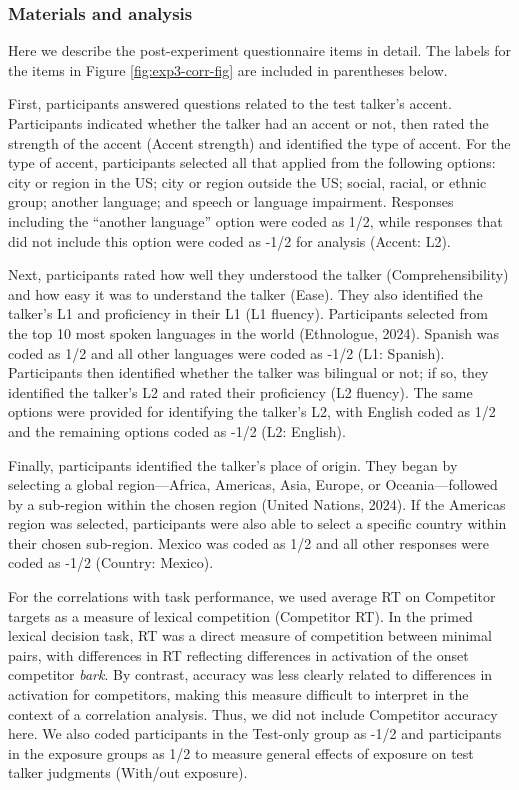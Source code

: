 \documentclass[
  12pt,
  twoside]{article}
\begin{document}
\hypertarget{corr-mat}{%
\subsubsection{Materials and analysis}\label{corr-mat}}

Here we describe the post-experiment questionnaire items in detail.
The labels for the items in Figure \ref{fig:exp3-corr-fig} are included in parentheses below.

First, participants answered questions related to the test talker's accent.
Participants indicated whether the talker had an accent or not, then rated the strength of the accent (Accent strength) and identified the type of accent.
For the type of accent, participants selected all that applied from the following options: city or region in the US; city or region outside the US; social, racial, or ethnic group; another language; and speech or language impairment.
Responses including the ``another language'' option were coded as 1/2, while responses that did not include this option were coded as -1/2 for analysis (Accent: L2).

Next, participants rated how well they understood the talker (Comprehensibility) and how easy it was to understand the talker (Ease).
They also identified the talker's L1 and proficiency in their L1 (L1 fluency).
Participants selected from the top 10 most spoken languages in the world (Ethnologue, 2024).
Spanish was coded as 1/2 and all other languages were coded as -1/2 (L1: Spanish).
Participants then identified whether the talker was bilingual or not; if so, they identified the talker's L2 and rated their proficiency (L2 fluency).
The same options were provided for identifying the talker's L2, with English coded as 1/2 and the remaining options coded as -1/2 (L2: English).

Finally, participants identified the talker's place of origin.
They began by selecting a global region---Africa, Americas, Asia, Europe, or Oceania---followed by a sub-region within the chosen region (United Nations, 2024).
If the Americas region was selected, participants were also able to select a specific country within their chosen sub-region.
Mexico was coded as 1/2 and all other responses were coded as -1/2 (Country: Mexico).

For the correlations with task performance, we used average RT on Competitor targets as a measure of lexical competition (Competitor RT).
In the primed lexical decision task, RT was a direct measure of competition between minimal pairs, with differences in RT reflecting differences in activation of the onset competitor \emph{bark}.
By contrast, accuracy was less clearly related to differences in activation for competitors, making this measure difficult to interpret in the context of a correlation analysis.
Thus, we did not include Competitor accuracy here.
We also coded participants in the Test-only group as -1/2 and participants in the exposure groups as 1/2 to measure general effects of exposure on test talker judgments (With/out exposure).
\end{document}
